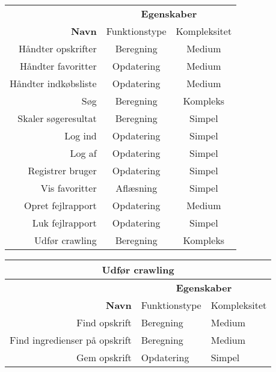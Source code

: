 \begin{table}[H]
  \centering
  \begin{tabular}{ r|c c }
    \hline
    & \multicolumn{2}{c}{\textbf{Egenskaber}} \\
    \textbf{Navn} & Funktionstype & Kompleksitet \\ \hline
    Håndter opskrifter & Beregning & Medium \\
    Håndter favoritter & Opdatering & Medium \\
    Håndter indkøbsliste & Opdatering & Medium \\
    Søg & Beregning & Kompleks \\
    Skaler søgeresultat & Beregning & Simpel \\
    Log ind & Opdatering  & Simpel  \\
    Log af & Opdatering & Simpel  \\
    Registrer bruger & Opdatering & Simpel  \\
    Vis favoritter & Aflæsning & Simpel  \\
    Opret fejlrapport & Opdatering & Medium \\
    Luk fejlrapport & Opdatering & Simpel  \\
    Udfør crawling & Beregning & Kompleks \\ \hline
  \end{tabular}
  \label{table:funktionsliste}
\end{table}

\begin{table}[H]
  \centering
  \begin{tabular}{ r| l l }

    \multicolumn{3}{c}{\textbf{Udfør crawling}} \\ \hline
    & \multicolumn{2}{c}{\textbf{Egenskaber}} \\
    \textbf{Navn} & Funktionstype & Kompleksitet \\ \hline
    Find opskrift & Beregning & Medium \\
    Find ingredienser på opskrift & Beregning & Medium \\
    Gem opskrift  & Opdatering & Simpel \\ \hline
  \end{tabular}
  \label{table:crawlingliste}
\end{table}
